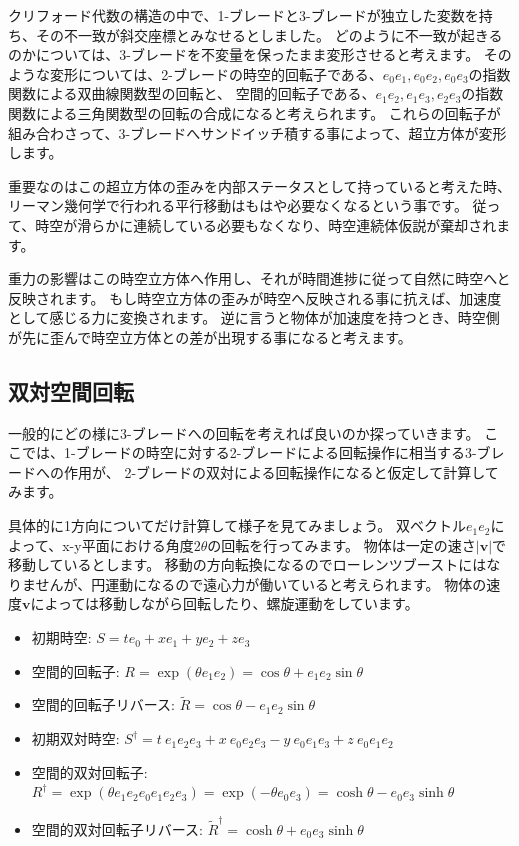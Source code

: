 \documentclass[a4paper,12pt,notitlepage]{jsreport}
\begin{document}
クリフォード代数の構造の中で、1-ブレードと3-ブレードが独立した変数を持ち、その不一致が斜交座標とみなせるとしました。
どのように不一致が起きるのかについては、3-ブレードを不変量を保ったまま変形させると考えます。
そのような変形については、2-ブレードの時空的回転子である、$ e_0 e_1, e_0 e_2, e_0 e_3 $の指数関数による双曲線関数型の回転と、
空間的回転子である、$ e_1 e_2, e_1 e_3, e_2 e_3 $の指数関数による三角関数型の回転の合成になると考えられます。
これらの回転子が組み合わさって、3-ブレードへサンドイッチ積する事によって、超立方体が変形します。

重要なのはこの超立方体の歪みを内部ステータスとして持っていると考えた時、
リーマン幾何学で行われる平行移動はもはや必要なくなるという事です。
従って、時空が滑らかに連続している必要もなくなり、時空連続体仮説が棄却されます。

重力の影響はこの時空立方体へ作用し、それが時間進捗に従って自然に時空へと反映されます。
もし時空立方体の歪みが時空へ反映される事に抗えば、加速度として感じる力に変換されます。
逆に言うと物体が加速度を持つとき、時空側が先に歪んで時空立方体との差が出現する事になると考えます。

\subsection{双対空間回転}

一般的にどの様に3-ブレードへの回転を考えれば良いのか探っていきます。
ここでは、1-ブレードの時空に対する2-ブレードによる回転操作に相当する3-ブレードへの作用が、
2-ブレードの双対による回転操作になると仮定して計算してみます。

具体的に1方向についてだけ計算して様子を見てみましょう。
双ベクトル$e_1e_2$によって、x-y平面における角度$2\theta$の回転を行ってみます。
物体は一定の速さ$|\bm{v}|$で移動しているとします。
移動の方向転換になるのでローレンツブーストにはなりませんが、円運動になるので遠心力が働いていると考えられます。
物体の速度$ \bm{v} $によっては移動しながら回転したり、螺旋運動をしています。
\begin{itemize}
  \item 初期時空: $S=te_0+xe_1+ye_2+ze_3$
  \item 空間的回転子: $R=\exp(\theta e_1e_2)=\cos\theta+e_1e_2\sin\theta$
  \item 空間的回転子リバース: $\widetilde{R}=\cos\theta-e_1e_2\sin\theta$
  \item 初期双対時空: $ S^\dag = t ~ e_1e_2e_3 + x ~ e_0e_2e_3 - y ~ e_0e_1e_3 + z ~ e_0e_1e_2 $
  \item 空間的双対回転子: $R^\dag=\exp(\theta e_1e_2e_0e_1e_2e_3)=\exp(-\theta e_0e_3)=\cosh\theta-e_0e_3\sinh\theta$
  \item 空間的双対回転子リバース: $\widetilde{R}^\dag=\cosh\theta+e_0e_3\sinh\theta$
\end{itemize}
\end{document}
